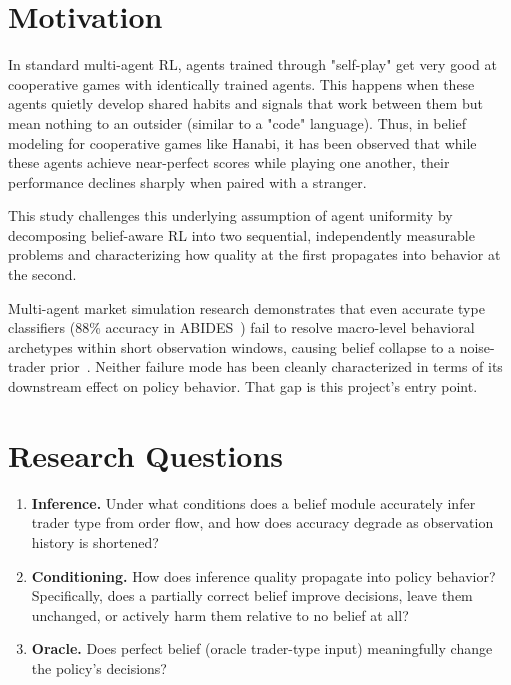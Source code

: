 \documentclass[8pt, a4paper]{article}
\begin{document}
\small{
\section{Motivation}

In standard multi-agent RL, agents trained through "self-play" get very good at cooperative games with identically trained agents. This happens when these agents quietly develop shared habits and signals that work between them but mean nothing to an outsider (similar to a "code" language). Thus, in belief modeling for cooperative games like Hanabi, it has been observed that while these agents achieve near-perfect scores while playing one another, their performance declines sharply when paired with a stranger. 

This study challenges this underlying assumption of agent uniformity by decomposing belief-aware RL into two sequential, independently measurable problems and characterizing how quality at the first propagates into behavior at the second.

Multi-agent market simulation research demonstrates that even accurate type classifiers (88\% accuracy in ABIDES~\cite{amrouni2024abides}) fail to resolve macro-level behavioral archetypes within short observation windows, causing belief collapse to a noise-trader prior~\cite{jasss2024hft}. Neither failure mode has been cleanly characterized in terms of its downstream effect on policy behavior. That gap is this project's entry point.

\vspace{-10pt}

\section{Research Questions}

\begin{enumerate}[leftmargin=*, label=\textbf{Q\arabic*.}]
    \item \textbf{Inference.} Under what conditions does a belief module accurately infer trader type from order flow, and how does accuracy degrade as observation history is shortened?
    \item \textbf{Conditioning.} How does inference quality propagate into policy behavior? Specifically, does a partially correct belief improve decisions, leave them unchanged, or actively harm them relative to no belief at all?
    \item \textbf{Oracle.} Does perfect belief (oracle trader-type input) meaningfully change the policy's decisions? 
\end{enumerate}

}
\end{document}
